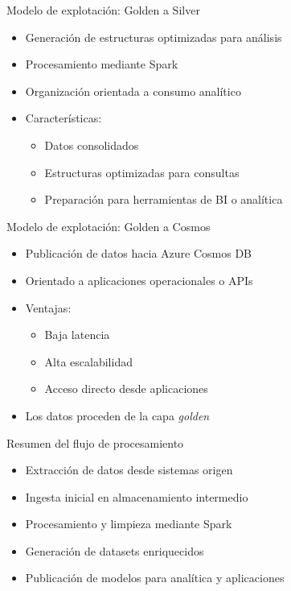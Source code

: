 \documentclass{beamer}
\begin{document}
\begin{frame}{Modelo de explotación: Golden a Silver}
\begin{itemize}
    \item Generación de estructuras optimizadas para análisis
    \item Procesamiento mediante Spark
    \item Organización orientada a consumo analítico
    \item Características:
    \begin{itemize}
        \item Datos consolidados
        \item Estructuras optimizadas para consultas
        \item Preparación para herramientas de BI o analítica
    \end{itemize}
\end{itemize}
\end{frame}

\begin{frame}{Modelo de explotación: Golden a Cosmos}
\begin{itemize}
    \item Publicación de datos hacia Azure Cosmos DB
    \item Orientado a aplicaciones operacionales o APIs
    \item Ventajas:
    \begin{itemize}
        \item Baja latencia
        \item Alta escalabilidad
        \item Acceso directo desde aplicaciones
    \end{itemize}
    \item Los datos proceden de la capa \textit{golden}
\end{itemize}
\end{frame}

\begin{frame}{Resumen del flujo de procesamiento}
\begin{itemize}
    \item Extracción de datos desde sistemas origen
    \item Ingesta inicial en almacenamiento intermedio
    \item Procesamiento y limpieza mediante Spark
    \item Generación de datasets enriquecidos
    \item Publicación de modelos para analítica y aplicaciones
\end{itemize}
\end{frame}
\end{document}
